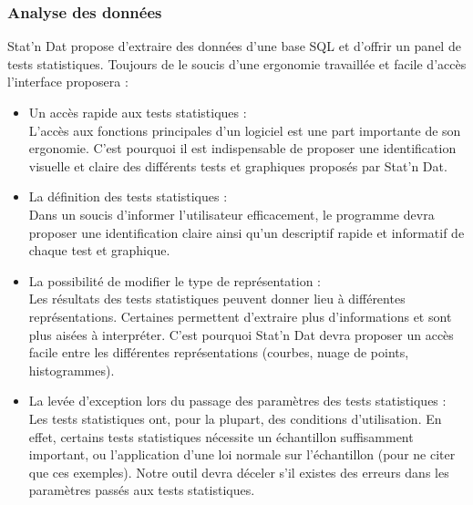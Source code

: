 \documentclass[a4paper,10pt]{report}
\begin{document}
\subsubsection{Analyse des données}

Stat'n Dat propose d'extraire des données d'une base SQL et d'offrir un panel de tests statistiques. Toujours de le soucis d'une ergonomie travaillée et facile d'accès l'interface proposera :\\

\begin{itemize}

\item Un accès rapide aux tests statistiques :\\
L'accès aux fonctions principales d'un logiciel est une part importante de son ergonomie. C'est pourquoi il est indispensable de proposer une identification visuelle et claire des différents tests et graphiques proposés par Stat'n Dat. 

\item La définition des tests statistiques :\\
Dans un soucis d'informer l'utilisateur efficacement, le programme devra proposer une identification claire ainsi qu'un descriptif rapide et informatif de chaque test et graphique.




\item La possibilité de modifier le type de représentation :\\
Les résultats des tests statistiques peuvent donner lieu à différentes représentations. Certaines permettent d'extraire plus d'informations et sont plus aisées à interpréter. C'est pourquoi Stat'n Dat devra proposer un accès facile entre les différentes représentations (courbes, nuage de points, histogrammes).

\item La levée d'exception lors du passage des paramètres des tests statistiques :\\
Les tests statistiques ont, pour la plupart, des conditions d'utilisation. En effet, certains tests statistiques nécessite un échantillon suffisamment important, ou l'application d'une loi normale sur l'échantillon (pour ne citer que ces exemples). Notre outil devra déceler s'il existes des erreurs dans les paramètres passés aux tests statistiques.

\end{itemize}
\end{document}
